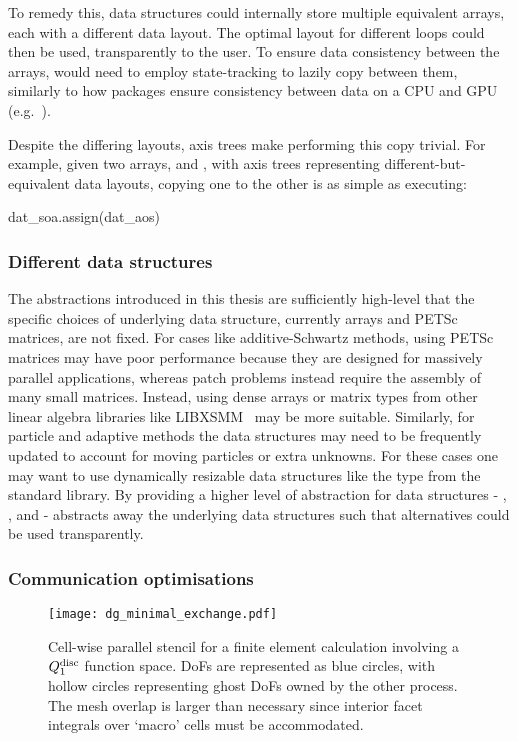\documentclass[thesis]{subfiles}
\begin{document}
To remedy this,  data structures could internally store multiple equivalent arrays, each with a different data layout.
The optimal layout for different loops could then be used, transparently to the user.
To ensure data consistency between the arrays,  would need to employ state-tracking to lazily copy between them, similarly to how packages ensure consistency between data on a CPU and GPU (e.g.~\cite{MILLS2021102831}).

Despite the differing layouts, axis trees make performing this copy trivial.
For example, given two arrays,  and , with axis trees representing different-but-equivalent data layouts, copying one to the other is as simple as executing:
\begin{pyinline}
  dat_soa.assign(dat_aos)
\end{pyinline}

\subsubsection{Different data structures}

The abstractions introduced in this thesis are sufficiently high-level that the specific choices of underlying data structure, currently \numpy{} arrays and PETSc matrices, are not fixed.
For cases like additive-Schwartz methods, using PETSc matrices may have poor performance because they are designed for massively parallel applications, whereas patch problems instead require the assembly of many small matrices.
Instead, using dense arrays or matrix types from other linear algebra libraries like LIBXSMM~\cite{heineckeLIBXSMMAcceleratingSmall2016} may be more suitable.
Similarly, for particle and adaptive methods the data structures may need to be frequently updated to account for moving particles or extra unknowns.
For these cases one may want to use dynamically resizable data structures like the  type from the \cplusplus{} standard library.
By providing a higher level of abstraction for data structures - , , and  -  abstracts away the underlying data structures such that alternatives could be used transparently.

\subsubsection{Communication optimisations}

\begin{figure}
  \centering
  \texttt{[image: dg\_minimal\_exchange.pdf]}
  \caption{
    Cell-wise parallel stencil for a finite element calculation involving a $Q_1^{\textnormal{disc}}$ function space.
    DoFs are represented as blue circles, with hollow circles representing ghost DoFs owned by the other process.
    The mesh overlap is larger than necessary since interior facet integrals over `macro' cells must be accommodated.
  }
  \label{fig:dg_minimal_exchange}
\end{figure}
\end{document}
